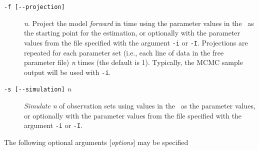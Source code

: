 \begin{description}
\item [\texttt{-f [-{}-projection]}] \emph{n}. Project the model \emph{forward} in time using the parameter values in the \config\ as the starting point for the estimation, or optionally with the parameter values from the file specified with the argument \texttt{-i} or \texttt{-I}. Projections are repeated for each parameter set (i.e., each line of data in the free parameter file) \emph{n} times (the default is 1). Typically, the MCMC sample output will be used with \texttt{-i}.
\item [\texttt{-s [-{}-simulation]} \emph{n}] \emph{Simulate} \emph{n} of observation sets using values in the \config\ as the parameter values, or optionally with the parameter values from the file specified with the argument \texttt{-i} or \texttt{-I}.

\end{description}

The following optional arguments [\emph{options}] may be specified

